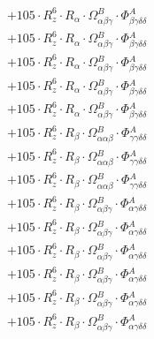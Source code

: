 \documentclass{article}
\begin{document}
\begin{subequations}
\begin{gather}
\begin{array}{c}
 \\[0.2em] 		 + 105 \cdot R_{z}^{6} \cdot R_{\alpha{}} \cdot \Omega{}^{B}_{\alpha{}\beta{}\gamma{}} \cdot \Phi{}^{A}_{\beta{}\gamma{}\delta{}\delta{}} 
 \\[0.2em] 		 + 105 \cdot R_{z}^{6} \cdot R_{\alpha{}} \cdot \Omega{}^{B}_{\alpha{}\beta{}\gamma{}} \cdot \Phi{}^{A}_{\beta{}\gamma{}\delta{}\delta{}} 
 \\[0.2em] 		 + 105 \cdot R_{z}^{6} \cdot R_{\alpha{}} \cdot \Omega{}^{B}_{\alpha{}\beta{}\gamma{}} \cdot \Phi{}^{A}_{\beta{}\gamma{}\delta{}\delta{}} 
 \\[0.2em] 		 + 105 \cdot R_{z}^{6} \cdot R_{\alpha{}} \cdot \Omega{}^{B}_{\alpha{}\beta{}\gamma{}} \cdot \Phi{}^{A}_{\beta{}\gamma{}\delta{}\delta{}} 
 \\[0.2em] 		 + 105 \cdot R_{z}^{6} \cdot R_{\alpha{}} \cdot \Omega{}^{B}_{\alpha{}\beta{}\gamma{}} \cdot \Phi{}^{A}_{\beta{}\gamma{}\delta{}\delta{}} 
 \\[0.2em] 		 + 105 \cdot R_{z}^{6} \cdot R_{\beta{}} \cdot \Omega{}^{B}_{\alpha{}\alpha{}\beta{}} \cdot \Phi{}^{A}_{\gamma{}\gamma{}\delta{}\delta{}} 
 \\[0.2em] 		 + 105 \cdot R_{z}^{6} \cdot R_{\beta{}} \cdot \Omega{}^{B}_{\alpha{}\alpha{}\beta{}} \cdot \Phi{}^{A}_{\gamma{}\gamma{}\delta{}\delta{}} 
 \\[0.2em] 		 + 105 \cdot R_{z}^{6} \cdot R_{\beta{}} \cdot \Omega{}^{B}_{\alpha{}\alpha{}\beta{}} \cdot \Phi{}^{A}_{\gamma{}\gamma{}\delta{}\delta{}} 
 \\[0.2em] 		 + 105 \cdot R_{z}^{6} \cdot R_{\beta{}} \cdot \Omega{}^{B}_{\alpha{}\beta{}\gamma{}} \cdot \Phi{}^{A}_{\alpha{}\gamma{}\delta{}\delta{}} 
 \\[0.2em] 		 + 105 \cdot R_{z}^{6} \cdot R_{\beta{}} \cdot \Omega{}^{B}_{\alpha{}\beta{}\gamma{}} \cdot \Phi{}^{A}_{\alpha{}\gamma{}\delta{}\delta{}} 
 \\[0.2em] 		 + 105 \cdot R_{z}^{6} \cdot R_{\beta{}} \cdot \Omega{}^{B}_{\alpha{}\beta{}\gamma{}} \cdot \Phi{}^{A}_{\alpha{}\gamma{}\delta{}\delta{}} 
 \\[0.2em] 		 + 105 \cdot R_{z}^{6} \cdot R_{\beta{}} \cdot \Omega{}^{B}_{\alpha{}\beta{}\gamma{}} \cdot \Phi{}^{A}_{\alpha{}\gamma{}\delta{}\delta{}} 
 \\[0.2em] 		 + 105 \cdot R_{z}^{6} \cdot R_{\beta{}} \cdot \Omega{}^{B}_{\alpha{}\beta{}\gamma{}} \cdot \Phi{}^{A}_{\alpha{}\gamma{}\delta{}\delta{}} 
 \\[0.2em] 		 + 105 \cdot R_{z}^{6} \cdot R_{\beta{}} \cdot \Omega{}^{B}_{\alpha{}\beta{}\gamma{}} \cdot \Phi{}^{A}_{\alpha{}\gamma{}\delta{}\delta{}} 

\end{array}
\end{gather}
\end{subequations}
\end{document}
